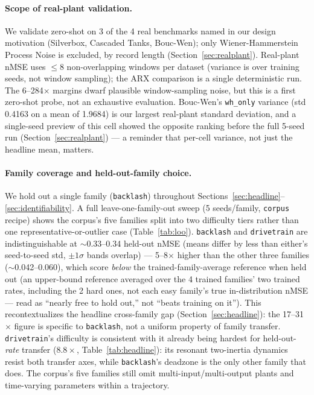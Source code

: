 \documentclass{article}
\begin{document}
\paragraph{Scope of real-plant validation.} We validate zero-shot on 3 of the 4
real benchmarks named in our design motivation (Silverbox, Cascaded Tanks,
Bouc-Wen); only Wiener-Hammerstein Process Noise is excluded, by record
length (Section~\ref{sec:realplant}). Real-plant nMSE uses $\leq$8
non-overlapping windows per dataset (variance is over training seeds, not
window sampling); the ARX comparison is a single deterministic run. The
6--284$\times$ margins dwarf plausible window-sampling noise, but this is a
first zero-shot probe, not an exhaustive evaluation. Bouc-Wen's
\texttt{wh\_only} variance (std 0.4163 on a mean of 1.9684) is our largest
real-plant standard deviation, and a single-seed preview of this cell showed
the opposite ranking before the full 5-seed run (Section~\ref{sec:realplant})
--- a reminder that per-cell variance, not just the headline mean, matters.

\paragraph{Family coverage and held-out-family choice.} We hold out a single
family (\texttt{backlash}) throughout Sections~\ref{sec:headline}--\ref{sec:identifiability}. A full leave-one-family-out sweep (5 seeds/family,
\texttt{corpus} recipe) shows the corpus's five families split into two
difficulty tiers rather than one representative-or-outlier case
(Table~\ref{tab:loo}). \texttt{backlash} and \texttt{drivetrain} are
indistinguishable at $\sim$0.33--0.34 held-out nMSE (means differ by less
than either's seed-to-seed std, $\pm1\sigma$ bands overlap) --- 5--8$\times$
higher than the other three families ($\sim$0.042--0.060), which score
\emph{below} the trained-family-average reference when held out (an
upper-bound reference averaged over the 4 trained families' two trained
rates, including the 2 hard ones, not each easy family's true
in-distribution nMSE --- read as ``nearly free to hold out,'' not ``beats
training on it''). This recontextualizes the headline cross-family gap
(Section~\ref{sec:headline}): the 17--31$\times$ figure is specific to
\texttt{backlash}, not a uniform property of family transfer.
\texttt{drivetrain}'s difficulty is consistent with it already being
hardest for held-out-\emph{rate} transfer ($8.8\times$,
Table~\ref{tab:headline}): its resonant two-inertia dynamics resist both
transfer axes, while \texttt{backlash}'s deadzone is the only other family
that does. The corpus's five families still omit multi-input/multi-output
plants and time-varying parameters within a trajectory.
\end{document}

